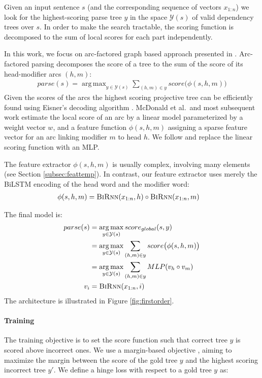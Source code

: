\documentclass[11pt]{article}
\DeclareMathOperator*{\argmax}{arg\,max}
\begin{document}
\noindent Given an input sentence $s$ (and the corresponding sequence of vectors
$x_{1:n}$) we look for the highest-scoring parse tree $y$ in the space
$\mathcal{Y}(s)$ of valid dependency trees over $s$. In order to make the search tractable, 
the scoring function is decomposed to the sum of local scores for each part independently. 

In this work, we focus on arc-factored graph based approach presented in .
Arc-factored parsing decomposes the score of a tree to the sum of the score of its
head-modifier arcs $(h,m)$:
\begin{align*}
parse(s) = \argmax_{y \in \mathcal{Y}(s)} \sum_{(h,m)\in y} score\big(\phi(s, h, m)\big)
\end{align*}
Given the scores of the arcs the highest scoring projective tree can be
efficiently found using Eisner's decoding algorithm .
McDonald et al.\ and most subsequent work estimate the local score of an arc by a
linear model parameterized by a weight vector $w$, and a feature function $\phi(s,h,m)$ assigning a sparse
feature vector for an arc linking modifier $m$ to head $h$. We follow  and replace the linear scoring function with an
MLP.

The feature extractor $\phi(s,h,m)$ is usually complex, involving many elements (see  Section \ref{subsec:feattemp}).
In contrast, our feature extractor uses merely the \mbox{BiLSTM} encoding of the head word and the
modifier word:
\begin{align*}
& \phi(s,h,m) = \textsc{BiRnn}(x_{1:n}, h) \circ \textsc{BiRnn}(x_{1:n}, m) \end{align*}

\noindent The final model is:
\begin{align*}
 parse(s) &= \argmax_{y \in \mathcal{Y}(s)} score_{global}(s,y) \\
          &= \argmax_{y \in \mathcal{Y}(s)} \sum_{(h, m) \in y} score\big(\phi(s,h,m)\big) \\
          &= \argmax_{y \in \mathcal{Y}(s)} \sum_{(h, m) \in y} MLP(v_h \circ v_m) \\
v_i &= \textsc{BiRnn}(x_{1:n}, i)
\end{align*}
\noindent The architecture is illustrated in Figure \ref{fig:firstorder}.

\paragraph{Training} The training objective is to set the score function such that correct tree $y$ is scored
above incorrect ones. We use a margin-based objective
\cite{mst,lecun2006tutorial}, 
aiming to maximize the margin between the score of the gold tree $y$ and the highest scoring incorrect
tree $y'$. We define a hinge loss with respect to a gold tree $y$ as:
\end{document}
